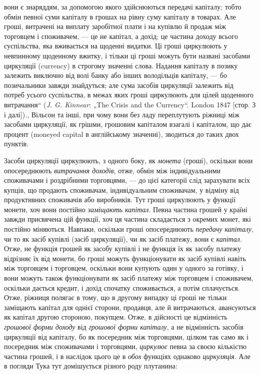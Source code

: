 {вони є знаряддям, за допомогою якого здійснюються передачі капіталу; тобто обмін певної суми
капіталу в грошах на рівну суму капіталу в товарах. Але гроші, витрачені на виплату заробітної плати
і на купівлю
й продаж між торговцем і споживачем, — це не капітал, а дохід; це частина доходу всього суспільства,
яка вживається на щоденні видатки. Ці гроші циркулюють у невпинному щоденному вжитку, і тільки ці
гроші можуть бути названі
засобами циркуляції (currency) в строгому значенні слова. Надання капіталу в
позику залежить виключно від волі банку або інших володільців капіталу, —
бо позичальники завжди знайдуться; але сума засобів циркуляції залежить від
потреб усього суспільства, в межах яких гроші циркулюють для цілей щоденного витрачання“ (\emph{J. G.
Kinnear}: „The Crisis and the Currency“. London 1847
[стор. З і далі]).}, Вільсон та інші, при чому вони
без ладу переплутують ріжниці між засобами циркуляції, як грішми, грошовим капіталом взагалі і
капіталом, що дає процент (moneyed
capital в англійському значенні), зводиться до таких двох пунктів.

Засоби циркуляції циркулюють, з одного боку, як \emph{монета}
(гроші), оскільки вони опосереднюють \emph{витрачання доходів}, отже,
обмін між індивідуальними споживачами і роздрібними торговцями, — до цієї категорії слід зарахувати
всіх купців, що продають споживачам, індивідуальним споживачам, у відміну від
продуктивних споживачів або виробників. Тут гроші циркулюють
у функції монети, хоч вони постійно \emph{заміщають капітал}.
Певна частина грошей у країні завжди присвячена цій функції,
хоч ця частина складається з окремих монет, які постійно міняються. Навпаки, оскільки гроші
опосереднюють \emph{передачу капіталу}, чи то як засіб купівлі (засіб циркуляції), чи як засіб
платежу, вони є \emph{капітал}. Отже, не функція грошей як засобу
купівлі і не функція їх як засобу платежу відрізняє їх від
монети, бо гроші можуть функціонувати як засіб купівлі навіть
між торговцем і торговцем, оскільки вони купують один у одного
за готівку, і вони можуть також функціонувати як засіб платежу
між торговцем і споживачем, оскільки дається кредит, і дохід спочатку споживається, а потім
сплачується. Отже, ріжниця полягає в тому, що в другому випадку ці гроші не тільки заміщають капітал
для однієї сторони, продавця, але й витрачаються,
авансуються як капітал другою стороною, покупцем. Отже,
в дійсності це відмінність \emph{грошової форми доходу} від \emph{грошової
форми капіталу}, а не відмінність засобів циркуляції від капіталу,
бо як посередник між торговцями, цілком так само як і посередник між споживачами і торговцями,
\emph{циркулює} певна за своєю
кількістю частина грошей, і в наслідок цього це в \emph{обох} функціях однаково \emph{циркуляція}. Але в погляди
Тука тут домішується
різного роду плутанина:

